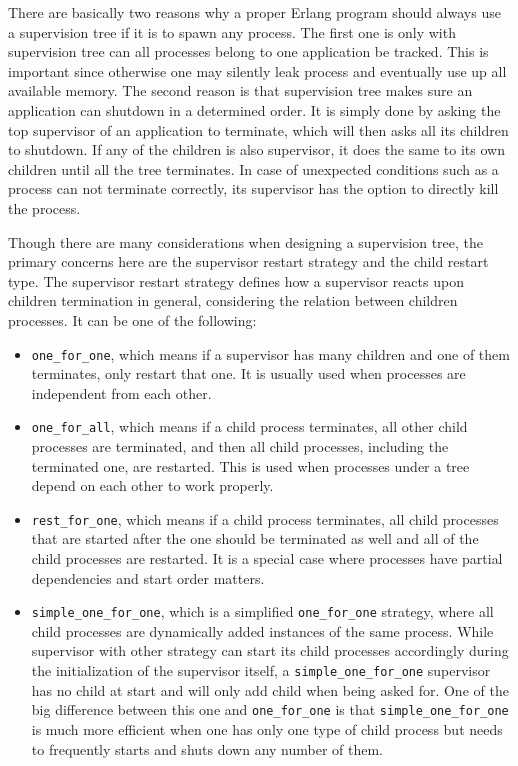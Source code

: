 There are basically two reasons why a proper Erlang program should always use a supervision tree if it is to spawn any process. The first one is only with supervision tree can all processes belong to one application be tracked. This is important since otherwise one may silently leak process and eventually use up all available memory. The second reason is that supervision tree makes sure an application can shutdown in a determined order. It is simply done by asking the top supervisor of an application to terminate, which will then asks all its children to shutdown. If any of the children is also supervisor, it does the same to its own children until all the tree terminates. In case of unexpected conditions such as a process can not terminate correctly, its supervisor has the option to directly kill the process.

Though there are many considerations when designing a supervision tree, the primary concerns here are the supervisor restart strategy and the child restart type. The supervisor restart strategy defines how a supervisor reacts upon children termination in general, considering the relation between children processes. It can be one of the following:

\begin{itemize}

\item \verb|one_for_one|, which means if a supervisor has many children and one of them terminates, only restart that one. It is usually used when processes are independent from each other.

\item \verb|one_for_all|, which means if a child process terminates, all other child processes are terminated, and then all child processes, including the terminated one, are restarted. This is used when processes under a tree depend on each other to work properly.

\item \verb|rest_for_one|, which means if a child process terminates, all child processes that are started after the one should be terminated as well and all of the child processes are restarted. It is a special case where processes have partial dependencies and start order matters.

\item \verb|simple_one_for_one|, which is a simplified \verb|one_for_one| strategy, where all child processes are dynamically added instances of the same process. While supervisor with other strategy can start its child processes accordingly during the initialization of the supervisor itself, a \verb|simple_one_for_one| supervisor has no child at start and will only add child when being asked for. One of the big difference between this one and \verb|one_for_one| is that \verb|simple_one_for_one| is much more efficient when one has only one type of child process but needs to frequently starts and shuts down any number of them.

\end{itemize}


